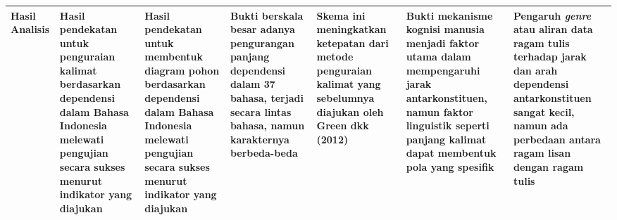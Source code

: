 \begin{landscape}
\begin{table}[htbp]
\begin{scriptsize}
\begin{center}
\begin{tabular}{| p{2cm} | p{3cm} | p{3cm} | p{3cm} | p{3cm} | p{3cm} | p{3cm} |}
Hasil Analisis & Hasil pendekatan untuk penguraian kalimat berdasarkan dependensi dalam Bahasa Indonesia melewati pengujian secara sukses menurut indikator yang diajukan & Hasil pendekatan untuk membentuk diagram pohon berdasarkan dependensi dalam Bahasa Indonesia melewati pengujian secara sukses menurut indikator yang diajukan & Bukti berskala besar adanya pengurangan panjang dependensi dalam 37 bahasa, terjadi secara lintas bahasa, namun karakternya berbeda-beda & Skema ini meningkatkan ketepatan dari metode penguraian kalimat yang sebelumnya diajukan oleh Green dkk (2012) & Bukti mekanisme kognisi manusia menjadi faktor utama dalam mempengaruhi jarak antarkonstituen, namun faktor linguistik seperti panjang kalimat dapat membentuk pola yang spesifik & Pengaruh \textit{genre} atau aliran data ragam tulis terhadap jarak dan arah dependensi antarkonstituen sangat kecil, namun ada perbedaan antara ragam lisan dengan ragam tulis \\ \hline

\end{tabular}
\end{center}
\end{scriptsize}
\end{table} 
\end{landscape}
\pagestyle{plain}


